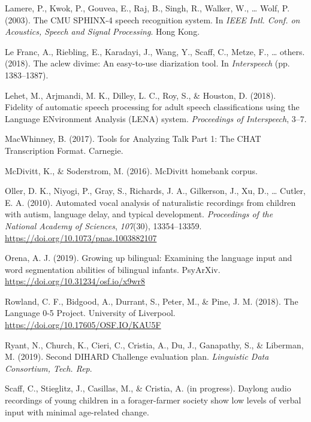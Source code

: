 \documentclass[english,table,man,floatsintext]{apa6}
\begin{document}
\hypertarget{ref-lamere2003cmu}{}
Lamere, P., Kwok, P., Gouvea, E., Raj, B., Singh, R., Walker, W.,
\ldots{} Wolf, P. (2003). The CMU SPHINX-4 speech recognition system. In
\emph{IEEE Intl. Conf. on Acoustics, Speech and Signal Processing}. Hong
Kong.

\hypertarget{ref-le2018aclew}{}
Le Franc, A., Riebling, E., Karadayi, J., Wang, Y., Scaff, C., Metze,
F., \ldots{} others. (2018). The aclew divime: An easy-to-use
diarization tool. In \emph{Interspeech} (pp. 1383--1387).

\hypertarget{ref-Lehet2018}{}
Lehet, M., Arjmandi, M. K., Dilley, L. C., Roy, S., \& Houston, D.
(2018). Fidelity of automatic speech processing for adult speech
classifications using the Language ENvironment Analysis (LENA) system.
\emph{Proceedings of Interspeech}, 3--7.

\hypertarget{ref-macwhinney2017tools}{}
MacWhinney, B. (2017). Tools for Analyzing Talk Part 1: The CHAT
Transcription Format. Carnegie.

\hypertarget{ref-mcdivitt2016mcdivitt}{}
McDivitt, K., \& Soderstrom, M. (2016). McDivitt homebank corpus.

\hypertarget{ref-Oller}{}
Oller, D. K., Niyogi, P., Gray, S., Richards, J. A., Gilkerson, J., Xu,
D., \ldots{} Cutler, E. A. (2010). Automated vocal analysis of
naturalistic recordings from children with autism, language delay, and
typical development. \emph{Proceedings of the National Academy of
Sciences}, \emph{107}(30), 13354--13359.
\url{https://doi.org/10.1073/pnas.1003882107}

\hypertarget{ref-orena_2019}{}
Orena, A. J. (2019). Growing up bilingual: Examining the language input
and word segmentation abilities of bilingual infants. PsyArXiv.
\url{https://doi.org/10.31234/osf.io/x9wr8}

\hypertarget{ref-rowland2018}{}
Rowland, C. F., Bidgood, A., Durrant, S., Peter, M., \& Pine, J. M.
(2018). The Language 0-5 Project. University of Liverpool.
\url{https://doi.org/10.17605/OSF.IO/KAU5F}

\hypertarget{ref-ryant2019second}{}
Ryant, N., Church, K., Cieri, C., Cristia, A., Du, J., Ganapathy, S., \&
Liberman, M. (2019). Second DIHARD Challenge evaluation plan.
\emph{Linguistic Data Consortium, Tech. Rep}.

\hypertarget{ref-scaff}{}
Scaff, C., Stieglitz, J., Casillas, M., \& Cristia, A. (in progress).
Daylong audio recordings of young children in a forager-farmer society
show low levels of verbal input with minimal age-related change.
\end{document}
